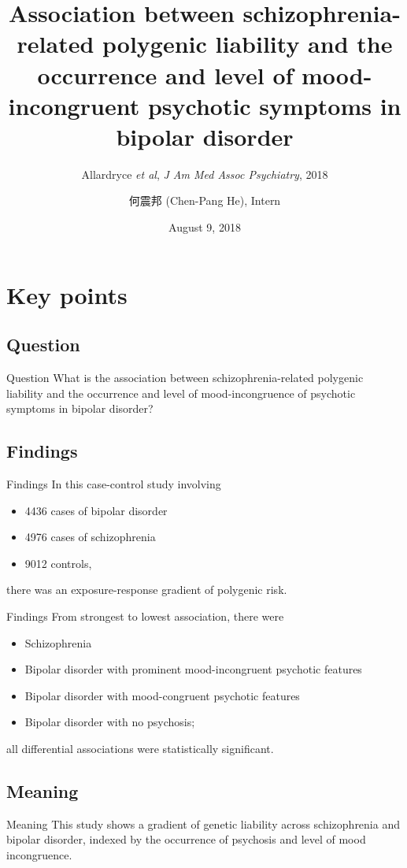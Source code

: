\documentclass{beamer}
\title[(Allardyce \textit{et al}, 2018)]{Association between schizophrenia-related polygenic liability and the occurrence and level of mood-incongruent psychotic symptoms in bipolar disorder}
\subtitle{Allardryce \textit{et al}, \textit{J Am Med Assoc Psychiatry}, 2018}
\author[Chen-Pang He]{何震邦 (Chen-Pang He), Intern}
\date{August 9, 2018}
\institute[CGH]{Cathay General Hospital}
\begin{document}
\maketitle

\section{Key points}
\subsection{Question}
\begin{frame}{Question}
    What is the association between schizophrenia-related polygenic liability
    and the occurrence and level of mood-incongruence of psychotic symptoms in
    bipolar disorder?
\end{frame}

\subsection{Findings}
\begin{frame}{Findings}
    In this case-control study involving
    \begin{itemize}
        \item 4436 cases of bipolar disorder
        \item 4976 cases of schizophrenia
        \item 9012 controls,
    \end{itemize}
    there was an exposure-response gradient of polygenic risk.
\end{frame}

\begin{frame}{Findings}
    From strongest to lowest association, there were
    \begin{itemize}
        \item Schizophrenia
        \item Bipolar disorder with prominent mood-incongruent psychotic features
        \item Bipolar disorder with mood-congruent psychotic features
        \item Bipolar disorder with no psychosis;
    \end{itemize}
    all differential associations were statistically significant.
\end{frame}

\subsection{Meaning}
\begin{frame}{Meaning}
    This study shows a gradient of genetic liability across schizophrenia and
    bipolar disorder, indexed by the occurrence of psychosis and level of mood
    incongruence.
\end{frame}
\end{document}
